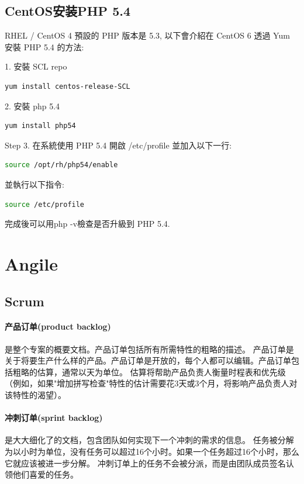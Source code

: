 \documentclass{book}
\begin{document}
\subsection{CentOS安装PHP 5.4}

RHEL / CentOS 4 預設的 PHP 版本是 5.3, 以下會介紹在 CentOS 6 透過 Yum 安裝 PHP 5.4 的方法:

1. 安裝 SCL repo

\begin{lstlisting}[language=Bash]
yum install centos-release-SCL
\end{lstlisting}


2. 安裝 php 5.4

\begin{lstlisting}[language=Bash]
yum install php54
\end{lstlisting}

Step 3. 在系統使用 PHP 5.4
開啟 /etc/profile 並加入以下一行:

\begin{lstlisting}[language=Bash]
source /opt/rh/php54/enable
\end{lstlisting}

並執行以下指令:

\begin{lstlisting}[language=Bash]
source /etc/profile
\end{lstlisting}

完成後可以用php -v檢查是否升級到 PHP 5.4.

\section{Angile}

\subsection{Scrum}

\paragraph{产品订单(product backlog)}是整个专案的概要文档。产品订单包括所有所需特性的粗略的描述。
产品订单是关于将要生产什么样的产品。产品订单是开放的，每个人都可以编辑。产品订单包括粗略的估算，通常以天为单位。
估算将帮助产品负责人衡量时程表和优先级（例如，如果"增加拼写检查"特性的估计需要花3天或3个月，将影响产品负责人对该特性的渴望）。

\paragraph{冲刺订单(sprint backlog)}是大大细化了的文档，包含团队如何实现下一个冲刺的需求的信息。
任务被分解为以小时为单位，没有任务可以超过16个小时。如果一个任务超过16个小时，那么它就应该被进一步分解。
冲刺订单上的任务不会被分派，而是由团队成员签名认领他们喜爱的任务。
\end{document}
